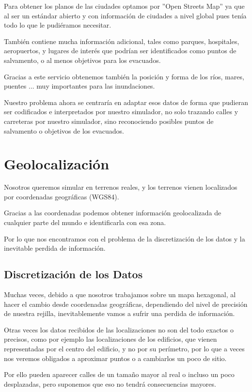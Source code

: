 Para obtener los planos de las ciudades optamos por ''Open Streets Map'' ya que
al ser un estándar abierto y con información de ciudades a nivel global pues
tenía todo lo que le pudiéramos necesitar. 

También contiene mucha información adicional, tales como parques, hospitales,
aeropuertos, y lugares de interés que podrían ser identificados como puntos de
salvamento, o al menos objetivos para los evacuados.

Gracias a este servicio obtenemos también la posición y forma de los ríos,
mares, puentes ... muy importantes para las inundaciones. 

Nuestro problema ahora se centraría en adaptar esos datos de forma que pudieran
ser codificados e interpretados por nuestro simulador, no solo trazando calles
y carreteras por nuestro simulador, sino reconociendo posibles puntos de
salvamento o objetivos de los evacuados.

\section*{Geolocalización}

Nosotros queremos simular en terrenos reales, y los terrenos vienen
localizados por coordenadas geográficas (WGS84).

Gracias a las coordenadas podemos obtener información geolocalizada de
cualquier parte del mundo e identificarla con esa zona.

Por lo que nos encontramos con el problema de la discretización de los
datos y la inevitable perdida de información.

\subsection*{Discretización de los Datos}
Muchas veces, debido a que nosotros trabajamos sobre un mapa hexagonal, al
hacer el cambio desde coordenadas geográficas, dependiendo del nivel de
precisión de nuestra rejilla, inevitablemente vamos a sufrir una perdida de
información.

Otras veces los datos recibidos de las localizaciones no son del todo exactos o
precisos, como por ejemplo las localizaciones de los edificios, que vienen
representadas por el centro del edificio, y no por su perímetro, por lo que a
veces nos veremos obligados a aproximar puntos o a cambiarlos un poco de sitio.

Por ello pueden aparecer calles de un tamaño mayor al real o incluso un poco
desplazadas, pero suponemos que eso no tendrá consecuencias mayores.

